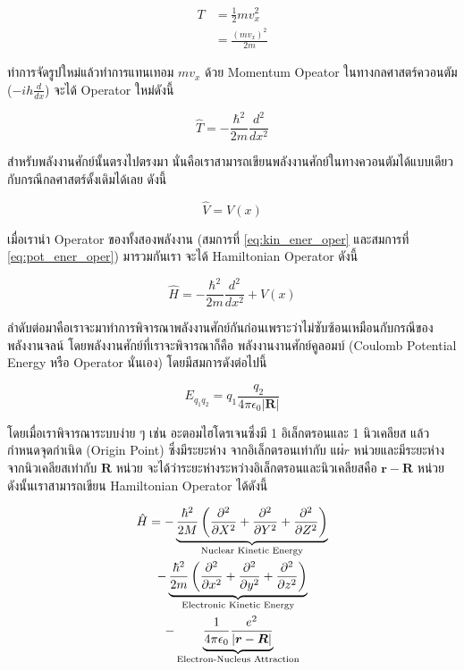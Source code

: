 \begin{align}
    T &= \frac{1}{2}mv^{2}_{x} \\
      &= \frac{(mv_{x})^{2}}{2m}
\end{align}

\noindent ทำการจัดรูปใหม่แล้วทำการแทนเทอม $mv_{x}$ ด้วย Momentum Opeator ในทางกลศาสตร์ควอนตัม ($-ih\frac{d}{dx}$) 
จะได้ Operator ใหม่ดังนี้

\begin{equation}\label{eq:kin_ener_oper}
    \hat{T} = -\frac{\hbar^{2}}{2m}\frac{d^{2}}{dx^{2}}
\end{equation}

สำหรับพลังงานศักย์นั้นตรงไปตรงมา นั่นคือเราสามารถเขียนพลังงานศักย์ในทางควอนตัมได้แบบเดียวกับกรณีกลศาสตร์ดั้งเดิมได้เลย ดังนี้

\begin{equation}\label{eq:pot_ener_oper}
    \hat{V} = V(x)
\end{equation}

เมื่อเรานำ Operator ของทั้งสองพลังงาน (สมการที่ \ref{eq:kin_ener_oper} และสมการที่ \ref{eq:pot_ener_oper}) มารวมกันเรา%
จะได้ Hamiltonian Operator ดังนี้

\begin{equation}
    \hat{H} = -\frac{\hbar^{2}}{2m}\frac{d^{2}}{dx^{2}} + V(x)
\end{equation}

ลำดับต่อมาคือเราจะมาทำการพิจารณาพลังงานศักย์กันก่อนเพราะว่าไม่ซับซ้อนเหมือนกับกรณีของพลังงานจลน์ โดยพลังงานศักย์ที่เราจะพิจารณาก็คือ%
พลังงานงานศักย์คูลอมบ์ (Coulomb Potential Energy หรือ Operator นั่นเอง) โดยมีสมการดังต่อไปนี้

\begin{equation}
    E_{q_{1}q_{2}} = q_{1}\frac{q_{2}}{4\pi\epsilon_{0}|\bm{R}|}
\end{equation}

โดยเมื่อเราพิจารณาระบบง่าย ๆ เช่น อะตอมไฮโดรเจนซึ่งมี 1 อิเล็กตรอนและ 1 นิวเคลียส แล้วกำหนดจุดกำเนิด (Origin Point) ซึ่งมีระยะห่าง%
จากอิเล็กตรอนเท่ากับ $แผ่{r}$ หน่วยและมีระยะห่างจากนิวเคลียสเท่ากับ $\bm{R}$ หน่วย จะได้ว่าระยะห่างระหว่างอิเล็กตรอนและนิวเคลียสคือ 
$\bm{r}-\bm{R}$ หน่วย ดังนั้นเราสามารถเขียน Hamiltonian Operator ได้ดังนี้

\begin{multline}\label{eq:hamil_hydrogen}
    \hat{H} = -\underbrace{\frac{\hbar^{2}}{2M} \left( \pdv[2]{X} + \pdv[2]{Y} + \pdv[2]{Z} \right)}_{%
                \text{Nuclear Kinetic Energy}} 
              \\
              -\underbrace{\frac{\hbar^{2}}{2m} \left( \pdv[2]{x} + \pdv[2]{y} + \pdv[2]{z} \right)}_{%
                \text{Electronic Kinetic Energy}}
              \\
              -\underbrace{\frac{1}{4\pi\epsilon_{0}}\frac{e^{2}}{|\bm{r}-\bm{R}|}}_{%
                \text{Electron-Nucleus Attraction}}
\end{multline}

